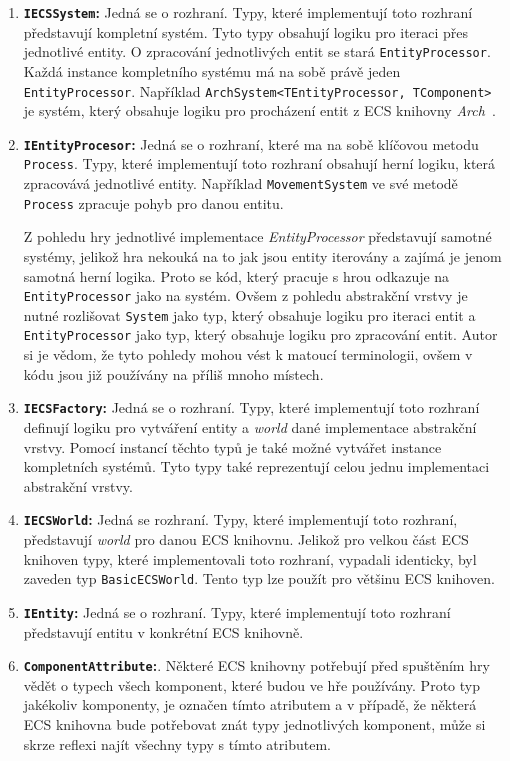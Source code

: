 \begin{enumerate}
    \item \textbf{\texttt{IECSSystem}:} Jedná se o rozhraní. Typy, které implementují toto rozhraní představují kompletní systém. Tyto typy obsahují logiku pro iteraci přes jednotlivé entity. O zpracování jednotlivých entit se stará \texttt{EntityProcessor}. Každá instance kompletního systému má na sobě právě jeden \texttt{EntityProcessor}. Například \texttt{ArchSystem<TEntityProcessor, TComponent>} je systém, který obsahuje logiku pro procházení entit z ECS knihovny \textit{Arch}~\cite{Arch}.

    \item \textbf{\texttt{IEntityProcesor}:} Jedná se o rozhraní, které ma na sobě klíčovou metodu \texttt{Process}. Typy, které implementují toto rozhraní obsahují herní logiku, která zpracovává jednotlivé entity. Například \verb|MovementSystem| ve své metodě \verb|Process| zpracuje pohyb pro danou entitu.

    Z pohledu hry jednotlivé implementace \textit{EntityProcessor} představují samotné systémy, jelikož hra nekouká na to jak jsou entity iterovány a zajímá je jenom samotná herní logika. Proto se kód, který pracuje s hrou odkazuje na \texttt{EntityProcessor} jako na systém. Ovšem z pohledu abstrakční vrstvy je nutné rozlišovat \texttt{System} jako typ, který obsahuje logiku pro iteraci entit a \texttt{EntityProcessor} jako typ, který obsahuje logiku pro zpracování entit. Autor si je vědom, že tyto pohledy mohou vést k matoucí terminologii, ovšem v kódu jsou již používány na příliš mnoho místech.

    \item \textbf{\texttt{IECSFactory}:} Jedná se o rozhraní. Typy, které implementují toto rozhraní definují logiku pro vytváření entity a \textit{world} dané implementace abstrakční vrstvy. Pomocí instancí těchto typů je také možné vytvářet instance kompletních systémů. Tyto typy také reprezentují celou jednu implementaci abstrakční vrstvy.

    \item \textbf{\texttt{IECSWorld}:} Jedná se rozhraní. Typy, které implementují toto rozhraní, představují \textit{world} pro danou ECS knihovnu. Jelikož pro velkou část ECS knihoven typy, které implementovali toto rozhraní, vypadali identicky, byl zaveden typ \texttt{BasicECSWorld}. Tento typ lze použít pro většinu ECS knihoven.

    \item \textbf{\texttt{IEntity}:} Jedná se o rozhraní. Typy, které implementují toto rozhraní představují entitu v konkrétní ECS knihovně.

    \item \textbf{\texttt{ComponentAttribute}:}. Některé ECS knihovny potřebují před spuštěním hry vědět o typech všech komponent, které budou ve hře používány. Proto typ jakékoliv komponenty, je označen tímto atributem a v případě, že některá ECS knihovna bude potřebovat znát typy jednotlivých komponent, může si skrze reflexi najít všechny typy s tímto atributem.
\end{enumerate}

